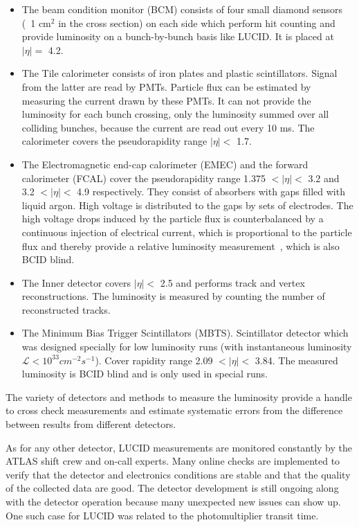 \begin{itemize}
 \item The beam condition monitor (BCM) consists of four small diamond sensors (~1 cm$^2$ in the cross section) on each side
 which perform hit counting and provide luminosity on a bunch-by-bunch basis like LUCID. It is placed at $|\eta| = $ 4.2.
 \item The Tile calorimeter consists of iron plates and plastic scintillators. 
 Signal from the latter are read by PMTs. Particle flux can be estimated by measuring the current drawn by these PMTs. 
 It can not provide the luminosity for each bunch crossing, only the luminosity summed over all colliding bunches, because the current are read out every 10 ms. 
 The calorimeter covers the pseudorapidity range $|\eta| < $ 1.7.
 \item The Electromagnetic end-cap calorimeter (EMEC) and the forward calorimeter (FCAL) cover the pseudorapidity range 1.375 $< |\eta| < $ 3.2 and 3.2 $< |\eta| < $ 4.9 respectively. 
 They consist of absorbers with gaps filled with liquid argon. High voltage is distributed to the gaps by sets of electrodes.
 The high voltage drops induced by the particle flux is counterbalanced by a continuous injection of electrical current, which is proportional to the particle flux and thereby provide a 
 relative luminosity measurement~\cite{Aaboud:2016hhf}, which is also BCID blind. 
 \item The Inner detector covers $|\eta| < $ 2.5 and performs track and vertex reconstructions. 
 The luminosity is measured by counting the number of reconstructed tracks.
 \item The Minimum Bias Trigger Scintillators (MBTS). Scintillator detector which was designed specially 
 for low luminosity runs (with instantaneous luminosity $\mathscr{L} < 10^{33} cm^{-2}s^{-1}$). 
 Cover rapidity range 2.09 $< |\eta| < $ 3.84. The measured luminosity is BCID blind and is only used in special runs.
\end{itemize}

The variety of detectors and methods to measure the luminosity provide a handle to cross check measurements and estimate systematic errors 
from the difference between results from different detectors.

As for any other detector, LUCID measurements are monitored constantly by the ATLAS shift crew and on-call experts. 
Many online checks are implemented to verify that the detector and electronics conditions are stable and that the quality of the collected data are good. 
The detector development is still ongoing along with the detector operation because many unexpected new issues can show up. 
One such case for LUCID was related to the photomultiplier transit time. 

